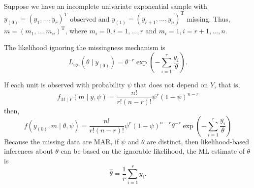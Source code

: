 \begin{example}
    Suppose we have an incomplete univariate exponential sample with $y_{(0)}=\left(y_{1},\ldots,y_{r}\right)^{\mathrm{T}}$ observed and $y_{(1)}=\left(y_{r+1},\ldots,y_{n}\right)^{\mathrm{T}}$ missing. Thus, $m=\left(m_{1},\ldots,m_{n}\right)^{\mathrm{T}}$, where $m_{i}=0,i=1,\ldots,r$ and $m_{i}=1,i=r+1,\ldots,n$.

    The likelihood ignoring the missingness mechanism is
    \begin{equation}
        L_{\mathrm{ign}}\left(\theta\mid y_{(0)}\right)=\theta^{-r}\exp\left(-\sum_{i=1}^{r}\frac{y_{i}}{\theta}\right).
    \end{equation}

    If each unit is observed with probability $\psi$ that does not depend on $Y$, that is,
    \begin{equation}
        f_{M\mid Y}(m\mid y,\psi)=\frac{n!}{r!(n-r)!}\psi^{r}(1-\psi)^{n-r}
    \end{equation}
    then,
    \begin{equation}
        f\left(y_{(0)},m\mid\theta,\psi\right)=\frac{n!}{r!(n-r)!}\psi^{r}(1-\psi)^{n-r}\theta^{-r}\exp\left(-\sum_{i=1}^{r}\frac{y_{i}}{\theta}\right)
    \end{equation}
    Because the missing data are MAR, if $\psi$ and $\theta$ are distinct, then likelihood-based
    inferences about $\theta$ can be based on the ignorable likelihood, the ML estimate of $\theta$ is
    \begin{equation}
        \hat{\theta}=\frac{1}{r}\sum_{i=1}^{r}y_{i}.
    \end{equation}


\end{example}
